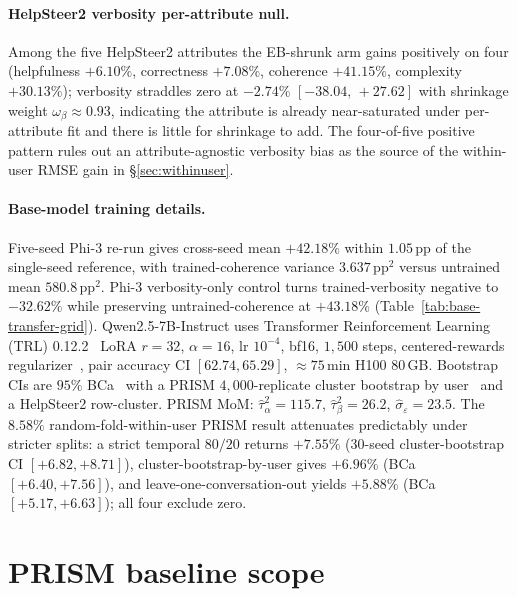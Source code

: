 \documentclass{article}
\begin{document}
\paragraph{HelpSteer2 verbosity per-attribute null.}
Among the five HelpSteer2 attributes the EB-shrunk arm gains
positively on four (helpfulness ${+}6.10\%$, correctness
${+}7.08\%$, coherence ${+}41.15\%$, complexity ${+}30.13\%$);
verbosity straddles zero at ${-}2.74\%$ $[-38.04,\,{+}27.62]$
with shrinkage weight $\omega_\beta\!\approx\!0.93$, indicating
the attribute is already near-saturated under per-attribute fit
and there is little for shrinkage to add. The four-of-five
positive pattern rules out an attribute-agnostic verbosity bias
as the source of the within-user RMSE gain in \S\ref{sec:withinuser}.

\paragraph{Base-model training details.}
\label{app:replication} Five-seed Phi-3 re-run gives
cross-seed mean ${+}42.18\%$ within $1.05$\,pp of the single-seed
reference, with trained-coherence variance $3.637$\,pp$^2$ versus
untrained mean $580.8$\,pp$^2$. Phi-3 verbosity-only
control turns trained-verbosity negative to ${-}32.62\%$ while
preserving untrained-coherence at ${+}43.18\%$
(Table~\ref{tab:base-transfer-grid}). Qwen2.5-7B-Instruct uses
Transformer Reinforcement Learning (TRL) 0.12.2~\citep{vonwerra2020trl} LoRA $r{=}32$, $\alpha{=}16$,
lr $10^{-4}$, bf16, $1{,}500$ steps, centered-rewards
regularizer~\citep{eisenstein2024helping}, pair accuracy CI
$[62.74, 65.29]$, $\approx 75$\,min H100 80\,GB. Bootstrap CIs
are $95\%$ BCa~\citep{efron1987better} with a PRISM
$4{,}000$-replicate cluster bootstrap by
user~\citep{cameron2008bootstrap} and a HelpSteer2 row-cluster.
PRISM MoM: $\hat\tau_\alpha^2{=}115.7$,
$\hat\tau_\beta^2{=}26.2$, $\hat\sigma_\varepsilon{=}23.5$.
The $8.58\%$ random-fold-within-user PRISM result attenuates
predictably under stricter splits: a strict temporal $80/20$
returns $+7.55\%$ ($30$-seed cluster-bootstrap CI
$[+6.82, +8.71]$), cluster-bootstrap-by-user gives $+6.96\%$
(BCa $[+6.40, +7.56]$), and leave-one-conversation-out yields
$+5.88\%$ (BCa $[+5.17, +6.63]$); all four exclude zero.

\section{PRISM baseline scope}
\label{app:baseline-scope}
\end{document}
